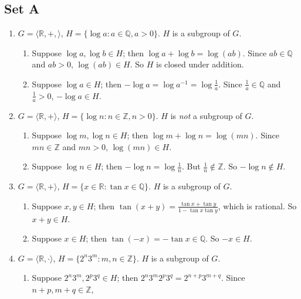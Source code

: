 \documentclass{article}
\begin{document}
\subsection{Set A}
\begin{enumerate}
    \item $G = \langle \mathbb{R}, +, \rangle$, $H = \{\log a: a \in \mathbb{Q}, a > 0\}$. $H$ is a subgroup of $G$.
        \begin{enumerate}[label=(\roman*)]
            \item Suppose $\log a, \log b \in H$; then $\log a + \log b = \log(ab)$. Since $ab \in \mathbb{Q}$ and $ab > 0$, $\log(ab) \in H$. So $H$ is closed under addition.
            \item Suppose $\log a \in H$; then $-\log a = \log a^{-1} = \log \frac{1}{a}$. Since $ \frac{1}{a} \in \mathbb{Q}$ and $\frac{1}{a} > 0$, $-\log a \in H$.
        \end{enumerate}
    \item $G = \langle\mathbb{R}, +\rangle$, $H = \{\log n: n \in \mathbb{Z}, n > 0\}$. $H$ is \emph{not} a subgroup of $G$.
        \begin{enumerate}[label=(\roman*)]
            \item Suppose $\log m, \log n \in H$; then $\log m + \log n = \log(mn)$. Since $mn \in \mathbb{Z}$ and $mn > 0$, $\log(mn) \in H$.
            \item Suppose $\log n \in H$; then $-\log n = \log\frac{1}{n}$. But $\frac{1}{n} \notin \mathbb{Z}$. So $-\log n \notin H$.
        \end{enumerate}
    \item $G = \langle\mathbb{R}, +\rangle$, $H = \{x \in \mathbb{R}: \tan x \in \mathbb{Q}\}$. $H$ is a subgroup of $G$.
        \begin{enumerate}[label=(\roman*)]
            \item Suppose $x, y \in H$; then $\tan(x + y) = \frac{\tan x + \tan y}{1 - \tan x \tan y}$, which is rational. So $x + y \in H$.
            \item Suppose $x \in H$; then $\tan(-x) = -\tan x \in \mathbb{Q}$. So $-x \in H$.
        \end{enumerate}
    \item $G = \langle \mathbb{R}, \cdot \rangle$, $H = \{2^n3^m: m, n \in \mathbb{Z}\}$. $H$ is a subgroup of $G$.
        \begin{enumerate}[label=(\roman*)]
            \item Suppose $2^{n}3^{m}, 2^{p}3^{q} \in H$; then $2^{n}3^{m}2^{p}3^{q} = 2^{n + p}3^{m + q}$. Since $n + p, m + q \in \mathbb{Z}$,

\end{enumerate}
\end{enumerate}
\end{document}
